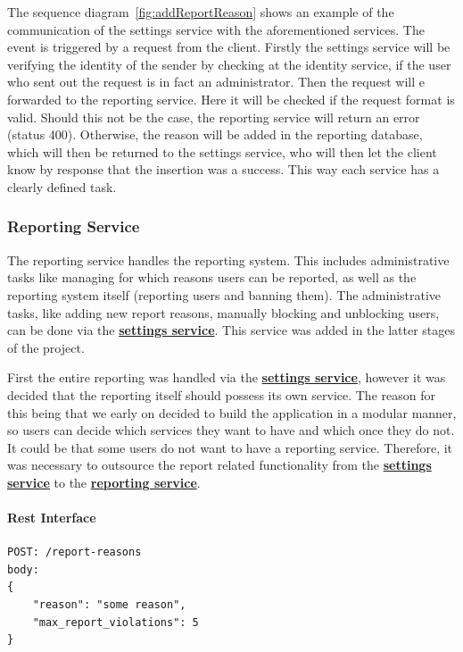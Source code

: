The sequence diagram~\ref{fig:addReportReason} shows an example of the communication of the settings service with the
aforementioned services.
The event is triggered by a request from the client.
Firstly the settings service will be verifying the identity of the sender by checking at the identity service, if the
user who sent out the request is in fact an administrator.
Then the request will e forwarded to the reporting service.
Here it will be checked if the request format is valid.
Should this not be the case, the reporting service will return an error (status 400).
Otherwise, the reason will be added in the reporting database, which will then be returned to the settings service,
who will then let the client know by response that the insertion was a success.
This way each service has a clearly defined task.

\subsubsection{Reporting Service}\label{subsubsec:reportingSer}

The reporting service handles the reporting system.
This includes administrative tasks like managing for which reasons users can be reported, as well as the reporting
system itself (reporting users and banning them).
The administrative tasks, like adding new report reasons, manually blocking and unblocking users, can be done via the
\hyperref[subsubsec:settingsSer]{\textbf{settings service}}.
This service was added in the latter stages of the project.

First the entire reporting was handled via the \hyperref[subsubsec:settingsSer]{\textbf{settings service}}, however it
was decided that the reporting itself should possess its own service.
The reason for this being that we early on decided to build the application in a modular manner, so users can decide
which services they want to have and which once they do not.
It could be that some users do not want to have a reporting service.
Therefore, it was necessary to outsource the report related functionality from the
\hyperref[subsubsec:settingsSer]{\textbf{settings service}} to the
\hyperref[subsubsec:reportingSer]{\textbf{reporting service}}.

\paragraph{Rest Interface}
\begin{lstlisting}
POST: /report-reasons
body:
{
    "reason": "some reason",
    "max_report_violations": 5
}
\end{lstlisting}

